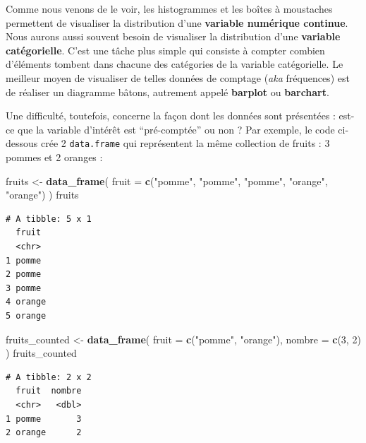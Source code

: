 \documentclass[a4paperpaper,]{article}
\newenvironment{Shaded}{\begin{snugshade}}{\end{snugshade}}
\newcommand{\DataTypeTok}[1]{\textcolor[rgb]{0.00,0.34,0.68}{#1}}
\newcommand{\DecValTok}[1]{\textcolor[rgb]{0.69,0.50,0.00}{#1}}
\newcommand{\KeywordTok}[1]{\textcolor[rgb]{0.12,0.11,0.11}{\textbf{#1}}}
\newcommand{\NormalTok}[1]{\textcolor[rgb]{0.12,0.11,0.11}{#1}}
\newcommand{\StringTok}[1]{\textcolor[rgb]{0.75,0.01,0.01}{#1}}
\theoremstyle{definition}
\theoremstyle{definition}
\theoremstyle{definition}
\theoremstyle{remark}
\begin{document}
Comme nous venons de le voir, les histogrammes et les boîtes à
moustaches permettent de visualiser la distribution d'une
\textbf{variable numérique continue}. Nous aurons aussi souvent besoin
de visualiser la distribution d'une \textbf{variable catégorielle}.
C'est une tâche plus simple qui consiste à compter combien d'éléments
tombent dans chacune des catégories de la variable catégorielle. Le
meilleur moyen de visualiser de telles données de comptage (\emph{aka}
fréquences) est de réaliser un diagramme bâtons, autrement appelé
\textbf{barplot} ou \textbf{barchart}.

Une difficulté, toutefois, concerne la façon dont les données sont
présentées : est-ce que la variable d'intérêt est ``pré-comptée'' ou non
? Par exemple, le code ci-dessous crée 2 \texttt{data.frame} qui
représentent la même collection de fruits : 3 pommes et 2 oranges :

\begin{Shaded}
\begin{Highlighting}[]
\NormalTok{fruits <-}\StringTok{ }\KeywordTok{data_frame}\NormalTok{(}
  \DataTypeTok{fruit =} \KeywordTok{c}\NormalTok{(}\StringTok{"pomme"}\NormalTok{, }\StringTok{"pomme"}\NormalTok{, }\StringTok{"pomme"}\NormalTok{, }\StringTok{"orange"}\NormalTok{, }\StringTok{"orange"}\NormalTok{)}
\NormalTok{)}
\NormalTok{fruits}
\end{Highlighting}
\end{Shaded}

\begin{verbatim}
# A tibble: 5 x 1
  fruit 
  <chr> 
1 pomme 
2 pomme 
3 pomme 
4 orange
5 orange
\end{verbatim}

\begin{Shaded}
\begin{Highlighting}[]
\NormalTok{fruits_counted <-}\StringTok{ }\KeywordTok{data_frame}\NormalTok{(}
  \DataTypeTok{fruit =} \KeywordTok{c}\NormalTok{(}\StringTok{"pomme"}\NormalTok{, }\StringTok{"orange"}\NormalTok{),}
  \DataTypeTok{nombre =} \KeywordTok{c}\NormalTok{(}\DecValTok{3}\NormalTok{, }\DecValTok{2}\NormalTok{)}
\NormalTok{)}
\NormalTok{fruits_counted}
\end{Highlighting}
\end{Shaded}

\begin{verbatim}
# A tibble: 2 x 2
  fruit  nombre
  <chr>   <dbl>
1 pomme       3
2 orange      2
\end{verbatim}
\end{document}
